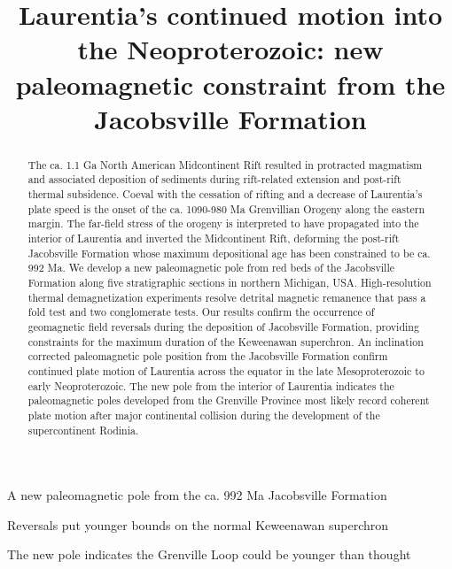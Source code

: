 \documentclass[draft]{agujournal2019}
\begin{document}
\title{Laurentia's continued motion into the Neoproterozoic: new paleomagnetic constraint from the Jacobsville Formation}




\begin{keypoints}
\item A new paleomagnetic pole from the ca. 992 Ma Jacobsville Formation 
\item Reversals put younger bounds on the normal Keweenawan superchron 
\item The new pole indicates the Grenville Loop could be younger than thought
\end{keypoints}


\begin{abstract}
The ca. 1.1 Ga North American Midcontinent Rift resulted in protracted magmatism and associated deposition of sediments during rift-related extension and post-rift thermal subsidence. Coeval with the cessation of rifting and a decrease of Laurentia's plate speed is the onset of the ca. 1090-980 Ma Grenvillian Orogeny along the eastern margin. The far-field stress of the orogeny is interpreted to have propagated into the interior of Laurentia and inverted the Midcontinent Rift, deforming the post-rift Jacobsville Formation whose maximum depositional age has been constrained to be ca. 992 Ma. We develop a new paleomagnetic pole from red beds of the Jacobsville Formation along five stratigraphic sections in northern Michigan, USA. High-resolution thermal demagnetization experiments resolve detrital magnetic remanence that pass a fold test and two conglomerate tests. Our results confirm the occurrence of geomagnetic field reversals during the deposition of Jacobsville Formation, providing constraints for the maximum duration of the Keweenawan superchron. An inclination corrected paleomagnetic pole position from the Jacobsville Formation confirm continued plate motion of Laurentia across the equator in the late Mesoproterozoic to early Neoproterozoic. The new pole from the interior of Laurentia indicates the paleomagnetic poles developed from the Grenville Province most likely record coherent plate motion after major continental collision during the development of the supercontinent Rodinia.
\end{abstract}
\end{document}
